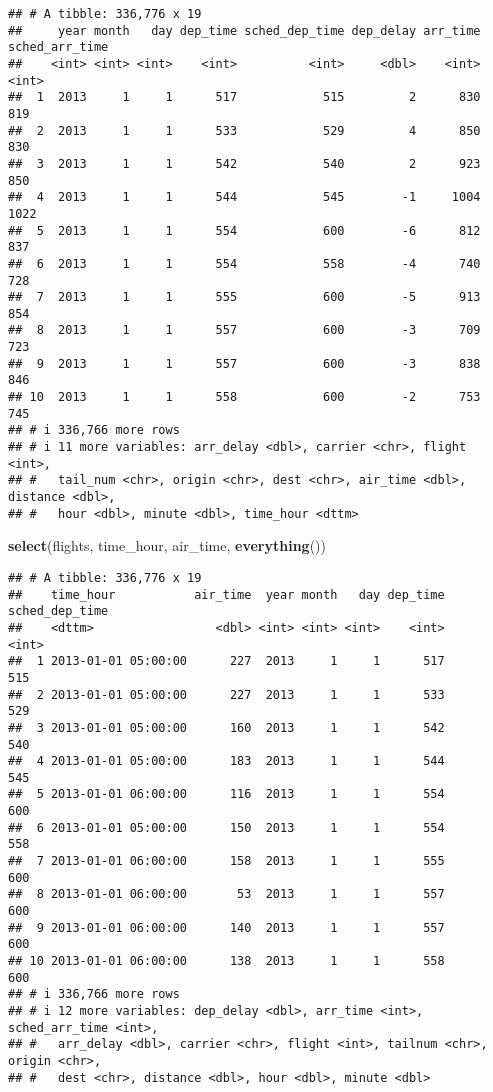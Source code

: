 \documentclass[
]{article}
\newenvironment{Shaded}{\begin{snugshade}}{\end{snugshade}}
\newcommand{\FunctionTok}[1]{\textcolor[rgb]{0.13,0.29,0.53}{\textbf{#1}}}
\newcommand{\NormalTok}[1]{#1}
\begin{document}
\begin{verbatim}
## # A tibble: 336,776 x 19
##     year month   day dep_time sched_dep_time dep_delay arr_time sched_arr_time
##    <int> <int> <int>    <int>          <int>     <dbl>    <int>          <int>
##  1  2013     1     1      517            515         2      830            819
##  2  2013     1     1      533            529         4      850            830
##  3  2013     1     1      542            540         2      923            850
##  4  2013     1     1      544            545        -1     1004           1022
##  5  2013     1     1      554            600        -6      812            837
##  6  2013     1     1      554            558        -4      740            728
##  7  2013     1     1      555            600        -5      913            854
##  8  2013     1     1      557            600        -3      709            723
##  9  2013     1     1      557            600        -3      838            846
## 10  2013     1     1      558            600        -2      753            745
## # i 336,766 more rows
## # i 11 more variables: arr_delay <dbl>, carrier <chr>, flight <int>,
## #   tail_num <chr>, origin <chr>, dest <chr>, air_time <dbl>, distance <dbl>,
## #   hour <dbl>, minute <dbl>, time_hour <dttm>
\end{verbatim}

\begin{Shaded}
\begin{Highlighting}[]
\FunctionTok{select}\NormalTok{(flights, time\_hour, air\_time, }\FunctionTok{everything}\NormalTok{())}
\end{Highlighting}
\end{Shaded}

\begin{verbatim}
## # A tibble: 336,776 x 19
##    time_hour           air_time  year month   day dep_time sched_dep_time
##    <dttm>                 <dbl> <int> <int> <int>    <int>          <int>
##  1 2013-01-01 05:00:00      227  2013     1     1      517            515
##  2 2013-01-01 05:00:00      227  2013     1     1      533            529
##  3 2013-01-01 05:00:00      160  2013     1     1      542            540
##  4 2013-01-01 05:00:00      183  2013     1     1      544            545
##  5 2013-01-01 06:00:00      116  2013     1     1      554            600
##  6 2013-01-01 05:00:00      150  2013     1     1      554            558
##  7 2013-01-01 06:00:00      158  2013     1     1      555            600
##  8 2013-01-01 06:00:00       53  2013     1     1      557            600
##  9 2013-01-01 06:00:00      140  2013     1     1      557            600
## 10 2013-01-01 06:00:00      138  2013     1     1      558            600
## # i 336,766 more rows
## # i 12 more variables: dep_delay <dbl>, arr_time <int>, sched_arr_time <int>,
## #   arr_delay <dbl>, carrier <chr>, flight <int>, tailnum <chr>, origin <chr>,
## #   dest <chr>, distance <dbl>, hour <dbl>, minute <dbl>
\end{verbatim}
\end{document}
